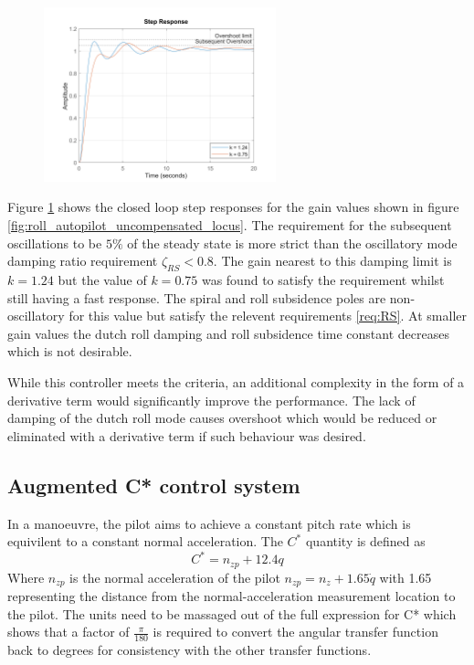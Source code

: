 \documentclass{article}
\begin{document}
\begin{figure}[H]
    \centering
    \includegraphics[width=0.6\textwidth]{figures/roll_autopilot_step_uncompensated.png}
    \caption{}
    \label{fig:roll_autopilot_step_uncompensated}
\end{figure}

Figure \ref{fig:roll_autopilot_step_uncompensated} shows the closed loop step responses for the gain values shown in figure \ref{fig:roll_autopilot_uncompensated_locus}.
The requirement for the subsequent oscillations to be $5 \%$ of the steady state is more strict than the oscillatory mode damping ratio requirement $\zeta_{RS}<0.8$.
The gain nearest to this damping limit is $k=1.24$ but the value of $k=0.75$ was found to satisfy the requirement whilst still having a fast response.
The spiral and roll subsidence poles are non-oscillatory for this value but satisfy the relevent requirements \ref{req:RS}.
At smaller gain values the dutch roll damping and roll subsidence time constant decreases which is not desirable.

While this controller meets the criteria, an additional complexity in the form of a derivative term would significantly improve the performance.
The lack of damping of the dutch roll mode causes overshoot which would be reduced or eliminated with a derivative term if such behaviour was desired.


\subsection{Augmented C* control system}

In a manoeuvre, the pilot aims to achieve a constant pitch rate which is equivilent to a constant normal acceleration.
The $C^*$ quantity is defined as
\begin{equation}
    C^* = n_{zp} + 12.4q
\end{equation}
Where $n_{zp}$ is the normal acceleration of the pilot $n_{zp} = n_z + 1.65 \dot{q}$ with 1.65 representing the distance from the normal-acceleration measurement location to the pilot.
The units need to be massaged out of the full expression for C* which shows that a factor of $\frac{\pi}{180}$ is required to convert the angular transfer function back to degrees for consistency with the other transfer functions.
\end{document}
